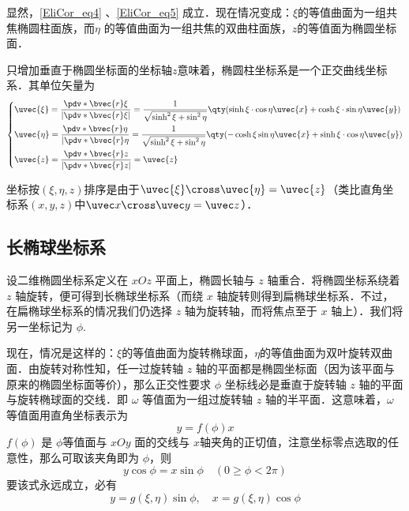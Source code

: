 显然，\autoref{EliCor_eq4} 、\autoref{EliCor_eq5} 成立．现在情况变成：$\xi$的等值曲面为一组共焦椭圆柱面族，而$\eta$ 的等值曲面为一组共焦的双曲柱面族，$z$的等值面为椭圆坐标面．

只增加垂直于椭圆坐标面的坐标轴$z$意味着，椭圆柱坐标系是一个正交曲线坐标系．其单位矢量为
\begin{equation}
\left\{
    \begin{aligned}
    &\uvec{\xi}=\frac{\pdv*{\bvec{r}}{\xi}}{|\pdv*{\bvec{r}}{\xi}|}=\frac{1}{\sqrt{\sinh^2\xi+\sin^2\eta}}\qty(\sinh\xi\cdot\cos\eta\uvec{x}+\cosh\xi\cdot\sin\eta\uvec{y})\\
    &\uvec{\eta }=\frac{\pdv*{\bvec{r}}{\eta}}{|\pdv*{\bvec{r}}{\eta}}=\frac{1}{\sqrt{\sinh^2\xi+\sin^2\eta}}\qty(-\cosh\xi\sin\eta\uvec{x}+\sinh\xi\cdot\cos\eta\uvec{y})\\
    &\uvec{z}=\frac{\pdv*{\bvec{r}}{z}}{|\pdv*{\bvec{r}}{z}|}=\uvec{z}
    \end{aligned}\right.
\end{equation}

坐标按$(\xi,\eta,z)$排序是由于$\uvec{\xi}\cross\uvec{\eta}=\uvec{z}$（类比直角坐标系$(x,y,z)$中$\uvec x\cross\uvec y=\uvec z$）．
\subsection{长椭球坐标系}
设二维椭圆坐标系定义在 $xOz$ 平面上，椭圆长轴与 $z$ 轴重合．将椭圆坐标系绕着 $z$ 轴旋转，便可得到长椭球坐标系（而绕 $x$ 轴旋转则得到扁椭球坐标系．不过，在扁椭球坐标系的情况我们仍选择 $z$ 轴为旋转轴，而将焦点至于 $x$ 轴上）．我们将另一坐标记为 $\phi$.

现在，情况是这样的：$\xi$的等值曲面为旋转椭球面，$\eta$的等值曲面为双叶旋转双曲面．由旋转对称性知，任一过旋转轴 $z$ 轴的平面都是椭圆坐标面（因为该平面与原来的椭圆坐标面等价），那么正交性要求 $\phi$ 坐标线必是垂直于旋转轴 $z$ 轴的平面与旋转椭球面的交线．即 $\omega$ 等值面为一组过旋转轴 $z$ 轴的半平面．这意味着，$\omega$ 等值面用直角坐标表示为
\begin{equation}
y=f(\phi)x
\end{equation}
$f(\phi)$ 是 $\phi$等值面与 $xOy$ 面的交线与 $x$轴夹角的正切值，注意坐标零点选取的任意性，那么可取该夹角即为 $\phi$，则
\begin{equation}
y\cos\phi=x\sin\phi\quad(0\geq\phi<2\pi)
\end{equation}
要该式永远成立，必有
\begin{equation}\label{EliCor_eq2}
y=g(\xi,\eta)\sin\phi,\quad
x=g(\xi,\eta)\cos\phi
\end{equation}

